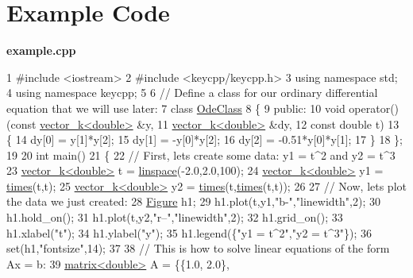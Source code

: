 \section*{\label{_example}%
Example Code}

{\bfseries {\ttfamily example.\-cpp}} 
\begin{DoxyCodeInclude}
1 \textcolor{preprocessor}{#include <iostream>}
2 \textcolor{preprocessor}{#include <keycpp/keycpp.h>}
3 \textcolor{keyword}{using namespace }std;
4 \textcolor{keyword}{using namespace }keycpp;
5 
6 \textcolor{comment}{// Define a class for our ordinary differential equation that we will use later:}
7 \textcolor{keyword}{class }\hyperlink{class_ode_class}{OdeClass}
8 \{
9     \textcolor{keyword}{public}:
10         \textcolor{keywordtype}{void} operator()(\textcolor{keyword}{const} \hyperlink{classkeycpp_1_1vector__k}{vector\_k<double>} &y,
11                         \hyperlink{classkeycpp_1_1vector__k}{vector\_k<double>} &dy,
12                         \textcolor{keyword}{const} \textcolor{keywordtype}{double} t)
13         \{
14             dy[0] = y[1]*y[2];
15             dy[1] = -y[0]*y[2];
16             dy[2] = -0.51*y[0]*y[1];
17         \}
18 \};
19 
20 \textcolor{keywordtype}{int} main()
21 \{
22     \textcolor{comment}{// First, lets create some data: y1 = t^2 and y2 = t^3}
23     \hyperlink{classkeycpp_1_1vector__k}{vector\_k<double>} t = \hyperlink{namespacekeycpp_ab690e7da060fb0e4c42e53cf65d76c7a}{linspace}(-2.0,2.0,100);
24     \hyperlink{classkeycpp_1_1vector__k}{vector\_k<double>} y1 = \hyperlink{namespacekeycpp_ac1ff99e34619478096c271b38df1f3d7}{times}(t,t);
25     \hyperlink{classkeycpp_1_1vector__k}{vector\_k<double>} y2 = \hyperlink{namespacekeycpp_ac1ff99e34619478096c271b38df1f3d7}{times}(t,\hyperlink{namespacekeycpp_ac1ff99e34619478096c271b38df1f3d7}{times}(t,t));
26 
27     \textcolor{comment}{// Now, lets plot the data we just created:}
28     \hyperlink{classkeycpp_1_1_figure}{Figure} h1;
29     h1.plot(t,y1,\textcolor{stringliteral}{"b-"},\textcolor{stringliteral}{"linewidth"},2);
30     h1.hold\_on();
31     h1.plot(t,y2,\textcolor{stringliteral}{"r--"},\textcolor{stringliteral}{"linewidth"},2);
32     h1.grid\_on();
33     h1.xlabel(\textcolor{stringliteral}{"t"});
34     h1.ylabel(\textcolor{stringliteral}{"y"});
35     h1.legend(\{\textcolor{stringliteral}{"y1 = t^2"},\textcolor{stringliteral}{"y2 = t^3"}\});
36     \textcolor{keyword}{set}(h1,\textcolor{stringliteral}{"fontsize"},14);
37 
38     \textcolor{comment}{// This is how to solve linear equations of the form Ax = b:}
39     \hyperlink{classkeycpp_1_1matrix}{matrix<double>} A = \{\{1.0, 2.0\},

\end{DoxyCodeInclude}
